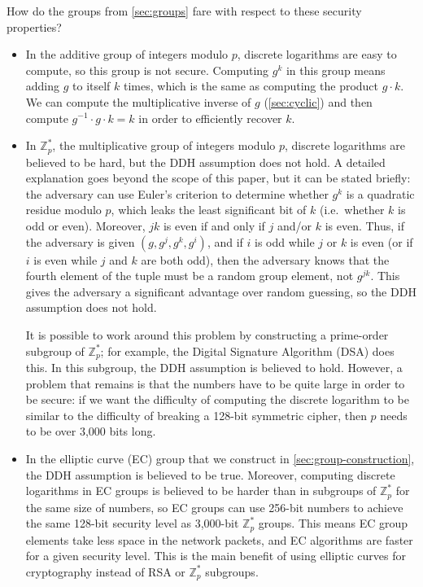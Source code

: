 \documentclass[manuscript]{acmart}
\begin{document}
How do the groups from \autoref{sec:groups} fare with respect to these security properties?
\begin{itemize}
\item In the additive group of integers modulo $p$, discrete logarithms are easy to compute, so this group is not secure.
    Computing $g^k$ in this group means adding $g$ to itself $k$ times, which is the same as computing the product $g \cdot k$.
    We can compute the multiplicative inverse of $g$ (\autoref{sec:cyclic}) and then compute $g^{-1} \cdot g \cdot k = k$ in order to efficiently recover $k$.

\item In $\mathbb{Z}_p^*$, the multiplicative group of integers modulo $p$, discrete logarithms are believed to be hard, but the DDH assumption does not hold.
    A detailed explanation goes beyond the scope of this paper, but it can be stated briefly: the adversary can use Euler's criterion to determine whether $g^k$ is a quadratic residue modulo $p$, which leaks the least significant bit of $k$ (i.e.\ whether $k$ is odd or even).
    Moreover, $jk$ is even if and only if $j$ and/or $k$ is even.
    Thus, if the adversary is given $(g, g^j, g^k, g^i)$, and if $i$ is odd while $j$ or $k$ is even (or if $i$ is even while $j$ and $k$ are both odd), then the adversary knows that the fourth element of the tuple must be a random group element, not $g^{jk}$.
    This gives the adversary a significant advantage over random guessing, so the DDH assumption does not hold.

    It is possible to work around this problem by constructing a prime-order subgroup of $\mathbb{Z}_p^*$; for example, the Digital Signature Algorithm (DSA) does this.
    In this subgroup, the DDH assumption is believed to hold.
    However, a problem that remains is that the numbers have to be quite large in order to be secure: if we want the difficulty of computing the discrete logarithm to be similar to the difficulty of breaking a 128-bit symmetric cipher, then $p$ needs to be over 3,000 bits long.

\item In the elliptic curve (EC) group that we construct in \autoref{sec:group-construction}, the DDH assumption is believed to be true.
    Moreover, computing discrete logarithms in EC groups is believed to be harder than in subgroups of $\mathbb{Z}_p^*$ for the same size of numbers, so EC groups can use 256-bit numbers to achieve the same 128-bit security level as 3,000-bit $\mathbb{Z}_p^*$ groups.
    This means EC group elements take less space in the network packets, and EC algorithms are faster for a given security level.
    This is the main benefit of using elliptic curves for cryptography instead of RSA or $\mathbb{Z}_p^*$ subgroups.
\end{itemize}
\end{document}
